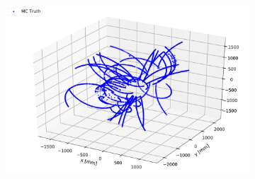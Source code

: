 \begin{figure}[ht]
	\centering
	\begin{subfigure}[b]{0.3\textwidth}
        \includegraphics[width=\textwidth]{figures/Zdd_3D.pdf}
        \caption{}


\end{subfigure}
\end{figure}
